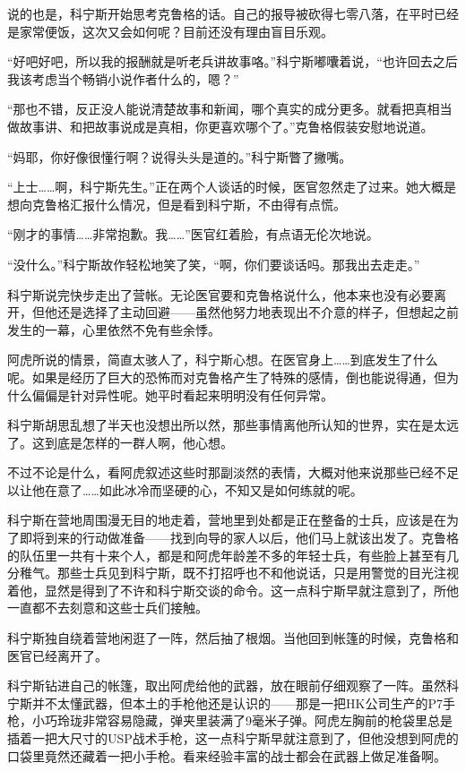 说的也是，科宁斯开始思考克鲁格的话。自己的报导被砍得七零八落，在平时已经是家常便饭，这次又会如何呢？目前还没有理由盲目乐观。

“好吧好吧，所以我的报酬就是听老兵讲故事咯。”科宁斯嘟囔着说，“也许回去之后我该考虑当个畅销小说作者什么的，嗯？”

“那也不错，反正没人能说清楚故事和新闻，哪个真实的成分更多。就看把真相当做故事讲、和把故事说成是真相，你更喜欢哪个了。”克鲁格假装安慰地说道。

“妈耶，你好像很懂行啊？说得头头是道的。”科宁斯瞥了撇嘴。

“上士……啊，科宁斯先生。”正在两个人谈话的时候，医官忽然走了过来。她大概是想向克鲁格汇报什么情况，但是看到科宁斯，不由得有点慌。

“刚才的事情……非常抱歉。我……”医官红着脸，有点语无伦次地说。

“没什么。”科宁斯故作轻松地笑了笑，“啊，你们要谈话吗。那我出去走走。”

科宁斯说完快步走出了营帐。无论医官要和克鲁格说什么，他本来也没有必要离开，但他还是选择了主动回避——虽然他努力地表现出不介意的样子，但想起之前发生的一幕，心里依然不免有些余悸。

阿虎所说的情景，简直太骇人了，科宁斯心想。在医官身上……到底发生了什么呢。如果是经历了巨大的恐怖而对克鲁格产生了特殊的感情，倒也能说得通，但为什么偏偏是针对异性呢。她平时看起来明明没有任何异常。

科宁斯胡思乱想了半天也没想出所以然，那些事情离他所认知的世界，实在是太远了。这到底是怎样的一群人啊，他心想。

不过不论是什么，看阿虎叙述这些时那副淡然的表情，大概对他来说那些已经不足以让他在意了……如此冰冷而坚硬的心，不知又是如何练就的呢。

科宁斯在营地周围漫无目的地走着，营地里到处都是正在整备的士兵，应该是在为了即将到来的行动做准备——找到向导的家人以后，他们马上就该出发了。克鲁格的队伍里一共有十来个人，都是和阿虎年龄差不多的年轻士兵，有些脸上甚至有几分稚气。那些士兵见到科宁斯，既不打招呼也不和他说话，只是用警觉的目光注视着他，显然是得到了不许和科宁斯交谈的命令。这一点科宁斯早就注意到了，所他一直都不去刻意和这些士兵们接触。

科宁斯独自绕着营地闲逛了一阵，然后抽了根烟。当他回到帐篷的时候，克鲁格和医官已经离开了。

科宁斯钻进自己的帐篷，取出阿虎给他的武器，放在眼前仔细观察了一阵。虽然科宁斯并不太懂武器，但本土的手枪他还是认识的——那是一把HK公司生产的P7手枪，小巧玲珑非常容易隐藏，弹夹里装满了9毫米子弹。阿虎左胸前的枪袋里总是插着一把大尺寸的USP战术手枪，这一点科宁斯早就注意到了，但他没想到阿虎的口袋里竟然还藏着一把小手枪。看来经验丰富的战士都会在武器上做足准备啊。

